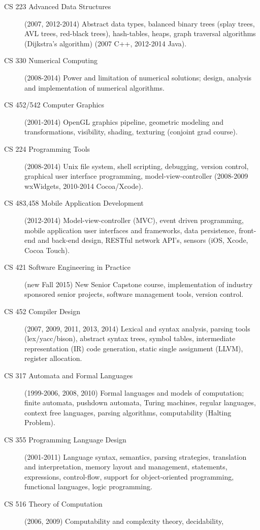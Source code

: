 \documentclass[10pt]{article}
\begin{document}
\begin{description}
  \item[CS 223 Advanced Data Structures] (2007, 2012-2014) Abstract data types, balanced binary trees (splay
     trees, AVL trees, red-black trees), hash-tables, heaps, graph traversal algorithms (Dijkstra's algorithm) 
     (2007 C++, 2012-2014 Java).
  \item[CS 330 Numerical Computing] (2008-2014) Power and limitation of numerical solutions; design, analysis 
      and implementation of numerical algorithms.
  \item[CS 452/542 Computer Graphics] (2001-2014) OpenGL %
      graphics pipeline, geometric modeling and
      transformations, visibility, shading, texturing (conjoint grad course).
  \item[CS 224 Programming Tools] (2008-2014) Unix file system, shell scripting, debugging, version control,
     graphical user interface programming, model-view-controller (2008-2009 wxWidgets, 2010-2014 Cocoa/Xcode).
  \item[CS 483,458 Mobile Application Development] (2012-2014) Model-view-controller (MVC), event driven
     programming, mobile application user interfaces and frameworks, data persistence, 
     front-end and back-end design, RESTful network API's, sensors (iOS, Xcode, Cocoa Touch).
  \item[CS 421 Software Engineering in Practice] (new Fall 2015) New Senior Capstone course, implementation of
     industry sponsored senior projects, software management tools, version control.
  \item[CS 452 Compiler Design] (2007, 2009, 2011, 2013, 2014) Lexical and syntax analysis, parsing tools
     (lex/yacc/bison), abstract syntax trees, symbol tables, intermediate representation (IR) code generation,
     static single assignment (LLVM), register allocation.
  \item[CS 317 Automata and Formal Languages] (1999-2006, 2008, 2010) Formal languages and 
     models of computation; finite automata, 
     pushdown automata, Turing machines, regular languages, context free languages, parsing algorithms, 
     computability (Halting Problem).
  \item[CS 355 Programming Language Design] (2001-2011) Language syntax, semantics, parsing strategies, translation
     and interpretation, memory layout and management, statements, expressions, control-flow, support
     for object-oriented programming, functional languages, logic programming.
  \item[CS 516 Theory of Computation] (2006, 2009) Computability and complexity theory, decidability, 

\end{description}
\end{document}
